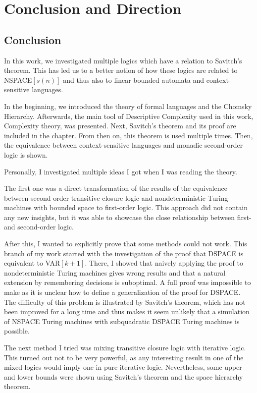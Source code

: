 \chapter{Conclusion and Direction}\label{ch:conclusion-and-direction}

\section{Conclusion}\label{sec:conclusion}
In this work, we investigated multiple logics which have a relation to Savitch's theorem.  %
This has led us to a better notion of how these logics are related to NSPACE$[s(n)]$ and thus also to linear bounded automata and context-sensitive languages.

In the beginning, we introduced the theory of formal languages and the Chomsky Hierarchy.
Afterwards, the main tool of Descriptive Complexity used in this work, Complexity theory, was presented.
Next, Savitch's theorem and its proof are included in the chapter.
From then on, this theorem is used multiple times.
Then, the equivalence between context-sensitive languages and monadic second-order logic is shown.

Personally, I investigated multiple ideas I got when I was reading the theory.

The first one was a direct transformation of the results of the equivalence between second-order transitive closure logic and nondeterministic Turing machines with bounded space to first-order logic. %
This approach did not contain any new insights, but it was able to showcase the close relationship between first- and second-order logic.

After this, I wanted to explicitly prove that some methods could not work.
This branch of my work started with the investigation of the proof that DSPACE is equivalent to VAR$[k + 1]$.
There, I showed that naively applying the proof to nondeterministic Turing machines gives wrong results and that a natural extension by remembering decisions is suboptimal.
A full proof was impossible to make as it is unclear how to define a generalization of the proof for DSPACE\@.
The difficulty of this problem is illustrated by Savitch's theorem, which has not been improved for a long time and thus makes it seem unlikely that a simulation of NSPACE Turing machines with subquadratic DSPACE Turing machines is possible.

The next method I tried was mixing transitive closure logic with iterative logic.
This turned out not to be very powerful, as any interesting result in one of the mixed logics would imply one in pure iterative logic.
Nevertheless, some upper and lower bounds were shown using Savitch's theorem and the space hierarchy theorem.

